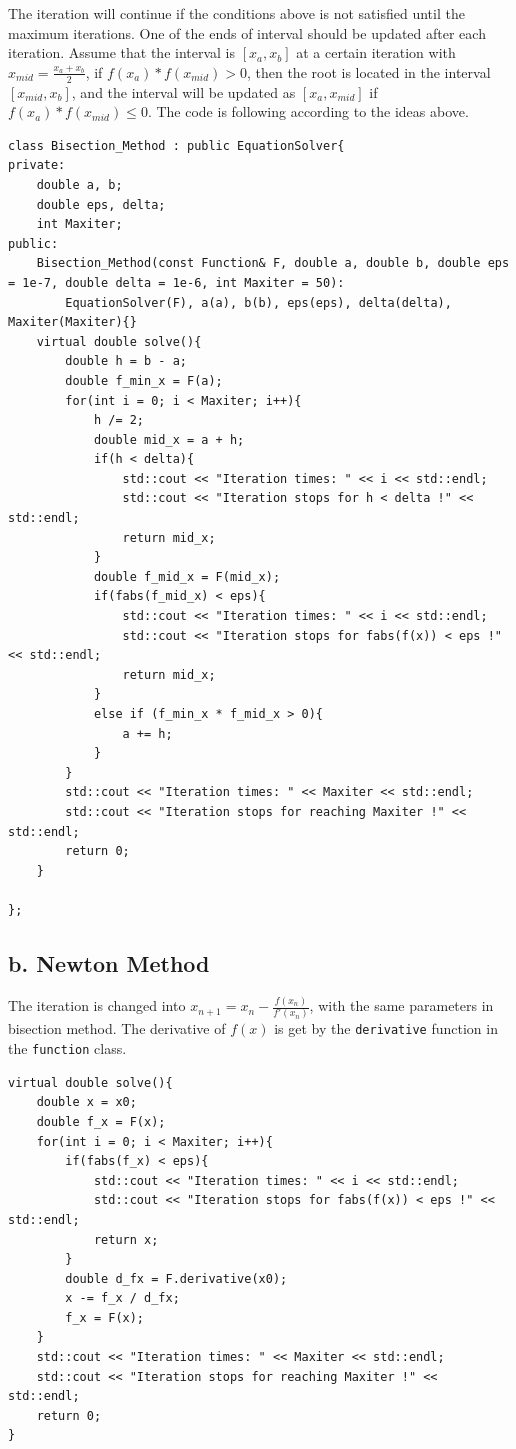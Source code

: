 \documentclass[a4paper]{article}
\begin{document}
The iteration will continue if the conditions above is not satisfied until the maximum iterations. One of the ends of interval should be updated after each iteration. Assume that the interval is $[x_a,x_b]$ at a certain iteration with $x_{mid} = \frac{x_a + x_b}{2}$, 
if $f(x_a) * f(x_{mid}) > 0$, then the root is located in the interval $[x_{mid}, x_b]$, and the interval will be updated as $[x_a, x_{mid}]$ if $f(x_a) * f(x_{mid}) \leq 0$. The code is following according to the
ideas above.
\begin{lstlisting}
class Bisection_Method : public EquationSolver{
private:
    double a, b;
    double eps, delta;
    int Maxiter;
public:
    Bisection_Method(const Function& F, double a, double b, double eps = 1e-7, double delta = 1e-6, int Maxiter = 50):
        EquationSolver(F), a(a), b(b), eps(eps), delta(delta), Maxiter(Maxiter){}
    virtual double solve(){
        double h = b - a;
        double f_min_x = F(a);
        for(int i = 0; i < Maxiter; i++){
            h /= 2;
            double mid_x = a + h;
            if(h < delta){
                std::cout << "Iteration times: " << i << std::endl;
                std::cout << "Iteration stops for h < delta !" << std::endl;
                return mid_x;
            }
            double f_mid_x = F(mid_x);
            if(fabs(f_mid_x) < eps){
                std::cout << "Iteration times: " << i << std::endl;
                std::cout << "Iteration stops for fabs(f(x)) < eps !" << std::endl;
                return mid_x;
            }
            else if (f_min_x * f_mid_x > 0){
                a += h;
            }
        }
        std::cout << "Iteration times: " << Maxiter << std::endl;
        std::cout << "Iteration stops for reaching Maxiter !" << std::endl;
        return 0;
    }

};
\end{lstlisting}

\subsection*{b. Newton Method}
The iteration is changed into $x_{n+1} = x_n - \frac{f(x_n)}{f'(x_n)}$, with the same parameters in bisection method. The derivative of $f(x)$ is get by the \verb|derivative| function 
in the \verb|function| class.
\begin{lstlisting}
virtual double solve(){
    double x = x0;
    double f_x = F(x);
    for(int i = 0; i < Maxiter; i++){
        if(fabs(f_x) < eps){
            std::cout << "Iteration times: " << i << std::endl;
            std::cout << "Iteration stops for fabs(f(x)) < eps !" << std::endl;
            return x;
        }
        double d_fx = F.derivative(x0);
        x -= f_x / d_fx;
        f_x = F(x);
    }
    std::cout << "Iteration times: " << Maxiter << std::endl;
    std::cout << "Iteration stops for reaching Maxiter !" << std::endl;
    return 0;
}
\end{lstlisting}
\end{document}
